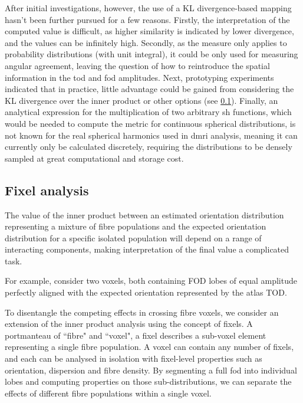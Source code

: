 After initial investigations, however, the use of a KL divergence-based mapping hasn't been further pursued for a few reasons.
Firstly, the interpretation of the computed value is difficult, as higher similarity is indicated by lower divergence, and the values can be infinitely high.
Secondly, as the measure only applies to probability distributions (with unit integral), it could be only used for measuring angular agreement, leaving the question of how to reintroduce the spatial information in the \gls{tod} and \gls{fod} amplitudes.
Next, prototyping experiments indicated that in practice, little advantage  could be gained from considering the KL  divergence over the inner product or other options (see \ref{sec:fixel}).
Finally, an analytical expression for the multiplication of two arbitrary \gls{sh} functions, which would be needed to compute the metric for continuous spherical distributions, is not known for the real spherical harmonics used in \gls{dmri} analysis, meaning it can currently only be calculated discretely, requiring the distributions to be densely sampled at great computational and storage cost.

\subsection{Fixel analysis}\label{sec:fixel}

The value of the inner product between an estimated orientation distribution representing a mixture of fibre populations and the expected orientation distribution for a specific isolated population will depend on a range of interacting components, making interpretation of the final value a complicated task.


For example, consider two voxels, both containing FOD lobes of equal amplitude perfectly aligned with the expected orientation represented by the atlas TOD.

To disentangle the competing effects in crossing fibre voxels, we consider an extension of the inner product analysis using the concept of fixels.
A portmanteau of ``fibre" and ``voxel", a fixel describes a sub-voxel element representing a single fibre population.
A voxel can contain any number of fixels, and each can be analysed in isolation with fixel-level properties such as orientation, dispersion and fibre density.
By segmenting a full \gls{fod} into individual lobes and computing properties on those sub-distributions, we can separate the effects of different fibre populations within a single voxel.

